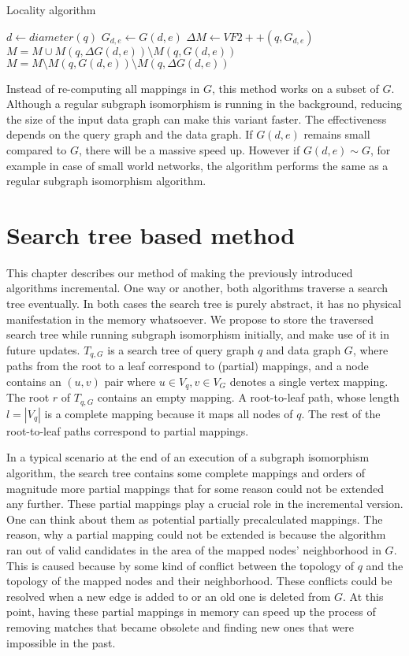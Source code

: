 
\begin{algorithm}
\caption{Locality algorithm}\label{alg:two}
$d \gets diameter(q)$\;
$G_{d, e} \gets G(d, e)$\;
$\Delta M \gets VF2++(q, G_{d, e})$\;
$M = M \cup M(q, \Delta G(d, e)) \setminus M(q, G(d, e))$\;
$M = M \setminus M(q, G(d, e)) \setminus M(q, \Delta G(d, e))$\;
\end{algorithm}

Instead of re-computing all mappings in $G$, this method works on a subset of $G$.
Although a regular subgraph isomorphism is running in the background, reducing the
size of the input data graph can make this variant faster. The effectiveness depends
on the query graph and the data graph. If $G(d, e)$ remains small compared to $G$,
there will be a massive speed up. However if $G(d, e) \sim G$, for example in case of
small world networks, the algorithm performs the same as a regular subgraph isomorphism
algorithm.


\section{Search tree based method}

This chapter describes our method of making the previously introduced algorithms
incremental. One way or another, both algorithms traverse a search tree eventually.
In both cases the search tree is purely abstract, it has no physical manifestation
in the memory whatsoever. We propose to store the traversed search tree while running
subgraph isomorphism initially, and make use of it in future updates. $T_{q, G}$ is a
search tree of query graph $q$ and data graph $G$, where paths from the root to a leaf
correspond to (partial) mappings, and a node contains an $(u, v)$ pair where 
$u \in V_q, v \in V_G$ denotes a single vertex mapping. The root $r$ of $T_{q, G}$
contains an empty mapping. A root-to-leaf path, whose length $l = |V_q|$ is a complete
mapping because it maps all nodes of $q$. The rest of the root-to-leaf paths correspond
to partial mappings.

In a typical scenario at the end of an execution of a subgraph isomorphism algorithm,
the search tree contains some complete mappings and orders of magnitude more partial 
mappings that for some reason could not be extended any further. These partial mappings 
play a crucial role in the incremental version. One can think about them as potential 
partially precalculated mappings. The reason, why a partial mapping could not be extended
is because the algorithm ran out of valid candidates in the area of the mapped nodes' 
neighborhood in \(G\). This is caused because by some kind of conflict between the 
topology of \(q\) and the topology of the mapped nodes and their neighborhood. These 
conflicts could be resolved when a new edge is added to or an old one is deleted from 
\(G\). At this point, having these partial mappings in memory can speed up the process 
of removing  matches that became obsolete and finding new ones that were impossible in 
the past.


